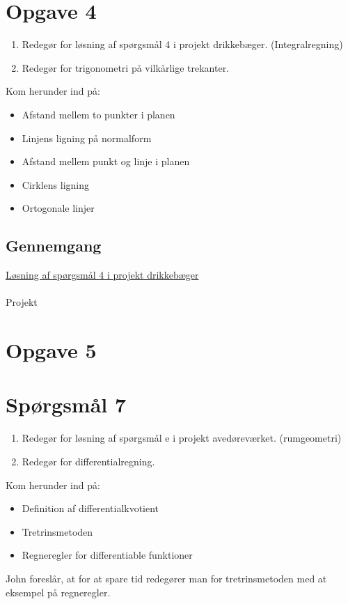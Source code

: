 \documentclass[a4paper, 11pt]{article}
\begin{document}
\section*{Opgave 4}
\begin{enumerate}[label=\alph*)]
    \item Redegør for løsning af spørgsmål 4 i projekt drikkebæger. (Integralregning)
    \item Redegør for trigonometri på vilkårlige trekanter.
\end{enumerate}
\indent \indent Kom herunder ind på:
\begin{itemize}
    \item Afstand mellem to punkter i planen
    \item Linjens ligning på normalform
    \item Afstand mellem punkt og linje i planen
    \item Cirklens ligning
    \item Ortogonale linjer
\end{itemize}
\subsection*{Gennemgang}
\underline{Løsning af spørgsmål 4 i projekt drikkebæger}\\\\
Projekt 
\section*{Opgave 5}
 
\section*{Spørgsmål 7} 
\begin{enumerate}[label=\alph*)]
    \item Redegør for løsning af spørgsmål e i projekt avedøreværket. (rumgeometri)
    \item Redegør for differentialregning.
\end{enumerate}
\indent \indent Kom herunder ind på:
\begin{itemize}
    \item Definition af differentialkvotient
    \item Tretrinsmetoden 
    \item Regneregler for differentiable funktioner
\end{itemize}
John foreslår, at for at spare tid redegører man for tretrinsmetoden med at eksempel på regneregler.
\end{document}
